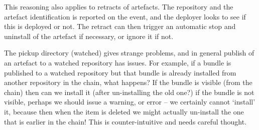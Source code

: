 \documentclass[a4paper,titlepage,twoside,12pt]{article}
\begin{document}
This reasoning also applies to retracts of artefacts. The repository and the artefact identification is reported on the event, and the deployer looks to see if this is deployed or not. The retract can then trigger an automatic stop and uninstall of the artefact if necessary, or ignore it if not.

The pickup directory (watched) gives strange problems, and in general publish of an artefact to a watched repository has issues. For example, if a bundle is published to a watched repository but that bundle is already installed from another repository in the chain, what happens?  If the bundle is visible (from the chain) then can we install it (after un-installing the old one?) if the bundle is not visible, perhaps we should issue a warning, or error -- we certainly cannot `install' it, because then when the item is deleted we might actually un-install the one that is earlier in the chain!  This is counter-intuitive and needs careful thought.
\end{document}
